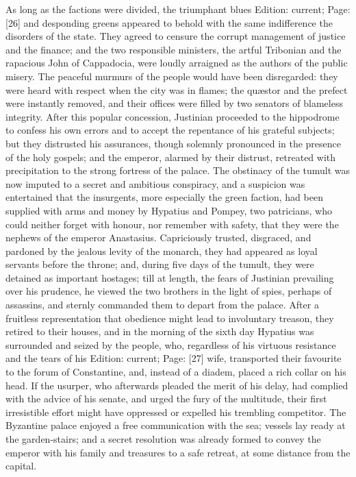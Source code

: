 As long as the factions were divided, the triumphant blues Edition: current; Page: [26] and desponding greens appeared to behold with the same indifference the disorders of the state. They agreed to censure the corrupt management of justice and the finance; and the two responsible ministers, the artful Tribonian and the rapacious John of Cappadocia, were loudly arraigned as the authors of the public misery. The peaceful murmurs of the people would have been disregarded: they were heard with respect when the city was in flames; the quæstor and the prefect were instantly removed, and their offices were filled by two senators of blameless integrity. After this popular concession, Justinian proceeded to the hippodrome to confess his own errors and to accept the repentance of his grateful subjects; but they distrusted his assurances, though solemnly pronounced in the presence of the holy gospels; and the emperor, alarmed by their distrust, retreated with precipitation to the strong fortress of the palace. The obstinacy of the tumult was now imputed to a secret and ambitious conspiracy, and a suspicion was entertained that the insurgents, more especially the green faction, had been supplied with arms and money by Hypatius and Pompey, two patricians, who could neither forget with honour, nor remember with safety, that they were the nephews of the emperor Anastasius. Capriciously trusted, disgraced, and pardoned by the jealous levity of the monarch, they had appeared as loyal servants before the throne; and, during five days of the tumult, they were detained as important hostages; till at length, the fears of Justinian prevailing over his prudence, he viewed the two brothers in the light of spies, perhaps of assassins, and sternly commanded them to depart from the palace. After a fruitless representation that obedience might lead to involuntary treason, they retired to their houses, and in the morning of the sixth day Hypatius was surrounded and seized by the people, who, regardless of his virtuous resistance and the tears of his Edition: current; Page: [27] wife, transported their favourite to the forum of Constantine, and, instead of a diadem, placed a rich collar on his head. If the usurper, who afterwards pleaded the merit of his delay, had complied with the advice of his senate, and urged the fury of the multitude, their first irresistible effort might have oppressed or expelled his trembling competitor. The Byzantine palace enjoyed a free communication with the sea; vessels lay ready at the garden-stairs; and a secret resolution was already formed to convey the emperor with his family and treasures to a safe retreat, at some distance from the capital.

